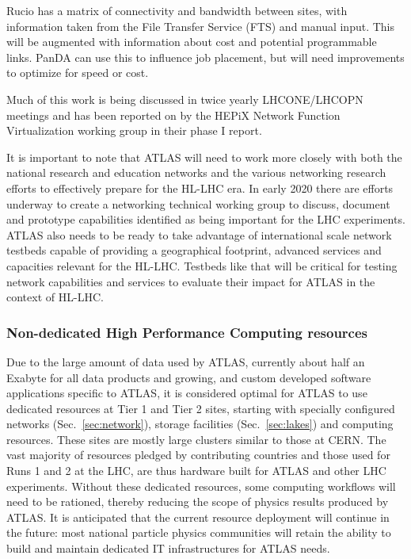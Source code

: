 Rucio has a matrix of connectivity and bandwidth between sites, with information taken from the File Transfer Service (FTS) and manual input. This will be augmented with information about cost and potential programmable links. PanDA can use this to influence job placement, but will need improvements to optimize for speed or cost.

Much of this work is being discussed in twice yearly LHCONE/LHCOPN meetings and has been reported on by the HEPiX Network Function Virtualization working group in their phase I report\cite{hepix_nfv_working_group_2019_3565563}.  

It is important to note that ATLAS will need to work more closely with both the national research and education networks and the various networking research efforts to effectively prepare for the HL-LHC era. In early 2020 there are efforts underway to create a networking technical working group to discuss, document and prototype capabilities identified as being important for the LHC experiments.  ATLAS also needs to be ready to take advantage of international scale network testbeds capable of providing a geographical footprint, advanced services and capacities relevant for the HL-LHC.  Testbeds like that will be critical for testing network capabilities and services to evaluate their impact for ATLAS in the context of HL-LHC. 


\subsubsection{Non-dedicated High Performance Computing resources}
\label{sec:hpc}

Due to the large amount of data used by ATLAS, currently about half an Exabyte for all data products and growing, and custom developed software applications specific to ATLAS, it is considered optimal for ATLAS to use dedicated resources at Tier 1 and Tier 2 sites, starting with specially configured networks (Sec.~\ref{sec:network}), storage facilities (Sec.~\ref{sec:lakes}) and computing resources. These sites are mostly large clusters similar to those at CERN. The vast majority of resources pledged by contributing countries and those used for Runs 1 and 2 at the LHC, are thus hardware built for ATLAS and other LHC experiments. Without these dedicated resources, some computing workflows will need to be rationed, thereby reducing the scope of physics results produced by ATLAS. It is anticipated that the current resource deployment will continue in the future: most national particle physics communities will retain the ability to build and maintain dedicated IT infrastructures for ATLAS needs.

